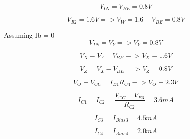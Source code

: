 \documentclass[12pt,a4paper]{article}
\begin{document}
\begin{equation}
  V_{IN} = V_{BE} = 0.8V
\end{equation}

\begin{equation}
  V_{B2} = 1.6V => V_{W} = 1.6 - V_{BE} = 0.8V
\end{equation}

Assuming Ib = 0
\begin{equation}
  V_{IN} = V_{Y} => V_{Y} = 0.8V
\end{equation}

\begin{equation}
  V_{X} = V_{Y} + V_{BE} => V_{X} = 1.6V
\end{equation}

\begin{equation}
  V_{Z} = V_{X} - V_{BE} => V_{Z} = 0.8V
\end{equation}

\begin{equation}
  V_{O} = V_{CC} - I_{B4} R_{C4} => V_{O} = 2.3V
\end{equation}

\begin{equation}
  I_{C1} = I_{C2} = \frac{V_{CC} - V_{B3}}{R_{C2}} = 3.6mA
\end{equation}

\begin{equation}
  I_{C3} = I_{Bias3} = 4.5mA
\end{equation}

\begin{equation}
  I_{C4} = I_{Bias4} = 2.0mA
\end{equation}
\end{document}

